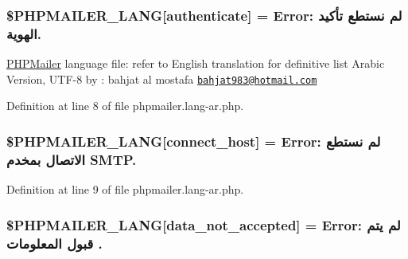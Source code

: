 \subsubsection[{\texorpdfstring{\$\+P\+H\+P\+M\+A\+I\+L\+E\+R\+\_\+\+L\+A\+NG}{$PHPMAILER_LANG}}]{\setlength{\rightskip}{0pt plus 5cm}\$P\+H\+P\+M\+A\+I\+L\+E\+R\+\_\+\+L\+A\+NG\mbox{[}\textquotesingle{}authenticate\textquotesingle{}\mbox{]} =  Error\+: لم نستطع تأكيد الهوية.\textquotesingle{}}\hypertarget{phpmailer_8lang-ar_8php_a2cb33073c989b85580748e331ed8b4aa}{}\label{phpmailer_8lang-ar_8php_a2cb33073c989b85580748e331ed8b4aa}
\hyperlink{class_p_h_p_mailer}{P\+H\+P\+Mailer} language file\+: refer to English translation for definitive list Arabic Version, U\+T\+F-\/8 by \+: bahjat al mostafa \href{mailto:bahjat983@hotmail.com}{\tt bahjat983@hotmail.\+com} 

Definition at line 8 of file phpmailer.\+lang-\/ar.\+php.

\subsubsection[{\texorpdfstring{\$\+P\+H\+P\+M\+A\+I\+L\+E\+R\+\_\+\+L\+A\+NG}{$PHPMAILER_LANG}}]{\setlength{\rightskip}{0pt plus 5cm}\$P\+H\+P\+M\+A\+I\+L\+E\+R\+\_\+\+L\+A\+NG\mbox{[}\textquotesingle{}connect\+\_\+host\textquotesingle{}\mbox{]} =  Error\+: لم نستطع الاتصال بمخدم S\+M\+T\+P.\textquotesingle{}}\hypertarget{phpmailer_8lang-ar_8php_a2ee0cc637a06b96e45600db31c6799ee}{}\label{phpmailer_8lang-ar_8php_a2ee0cc637a06b96e45600db31c6799ee}


Definition at line 9 of file phpmailer.\+lang-\/ar.\+php.

\subsubsection[{\texorpdfstring{\$\+P\+H\+P\+M\+A\+I\+L\+E\+R\+\_\+\+L\+A\+NG}{$PHPMAILER_LANG}}]{\setlength{\rightskip}{0pt plus 5cm}\$P\+H\+P\+M\+A\+I\+L\+E\+R\+\_\+\+L\+A\+NG\mbox{[}\textquotesingle{}data\+\_\+not\+\_\+accepted\textquotesingle{}\mbox{]} =  Error\+: لم يتم قبول المعلومات .\textquotesingle{}}\hypertarget{phpmailer_8lang-ar_8php_a814c6b191205d2361b3233e9c9d6fda5}{}\label{phpmailer_8lang-ar_8php_a814c6b191205d2361b3233e9c9d6fda5}


